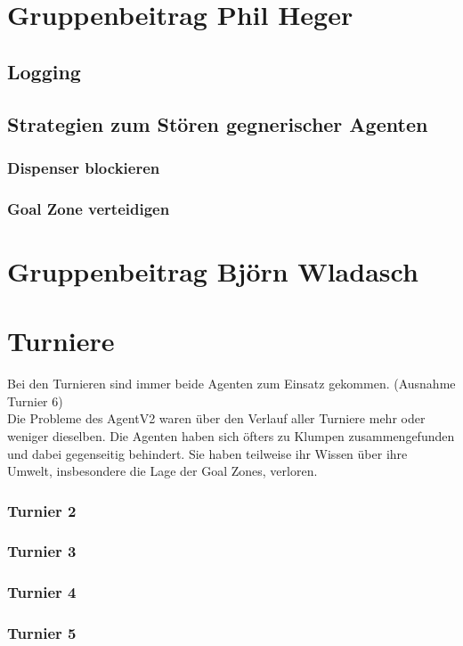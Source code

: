 \documentclass[runningheads]{llncs}
\begin{document}
\section{Gruppenbeitrag Phil Heger}
\subsection{Logging}
\subsection{Strategien zum Stören gegnerischer Agenten}
\subsubsection{Dispenser blockieren}
\subsubsection{Goal Zone verteidigen}

\section{Gruppenbeitrag Björn Wladasch}

\section{Turniere}
Bei den Turnieren sind immer beide Agenten zum Einsatz gekommen. (Ausnahme Turnier 6)\\
Die Probleme des AgentV2 waren über den Verlauf aller Turniere mehr oder weniger dieselben.  Die Agenten haben sich öfters zu Klumpen zusammengefunden und dabei gegenseitig behindert. Sie haben teilweise ihr Wissen über ihre Umwelt, insbesondere die Lage der Goal Zones, verloren. 

\subsubsection{Turnier 2}
\subsubsection{Turnier 3}
\subsubsection{Turnier 4}
\subsubsection{Turnier 5}
\end{document}
